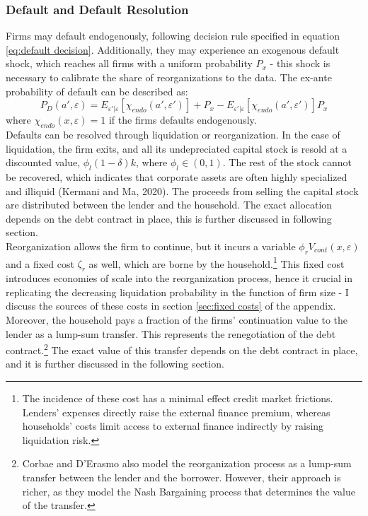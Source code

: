 \documentclass[12pt]{article}
\begin{document}
\subsubsection{Default and Default Resolution} \label{sec:default resolution}
Firms may default endogenously, following decision rule specified in equation \ref{eq:default decision}. Additionally, they may experience an exogenous default shock, which reaches all firms with a uniform probability $P_{x}$ - this shock is necessary to calibrate the share of reorganizations to the data. The ex-ante probability of default can be described as: 
\begin{equation} \label{eq:default probability}
    P_D(a', \varepsilon) = E_{\varepsilon'|\varepsilon}[\chi_{endo}(a',\varepsilon')] + P_{x} - E_{\varepsilon'|\varepsilon}[\chi_{endo}(a',\varepsilon')]P_{x}
\end{equation}
where $\chi_{endo}(x, \varepsilon) = 1$ if the firms defaults endogenously. \vspace{3mm} \\ 
Defaults can be resolved through liquidation or reorganization. In the case of liquidation, the firm exits, and all its undepreciated capital stock is resold at a discounted value, $\phi_l(1-\delta)k$, where $\phi_l \in (0,1)$. The rest of the stock cannot be recovered, which indicates that corporate assets are often highly specialized and illiquid (Kermani and Ma, 2020). The proceeds from selling the capital stock are distributed between the lender and the household. The exact allocation depends on the debt contract in place, this is further discussed in following section. \vspace{3mm} \\
Reorganization allows the firm to continue, but it incurs a variable $\phi_r V_{cont}(x,\varepsilon)$ and a fixed cost $\zeta_r$ as well, which are borne by the household.\footnote{The incidence of these cost has a minimal effect credit market frictions. Lenders' expenses directly raise the external finance premium, whereas households' costs limit access to external finance indirectly by raising liquidation risk.} This fixed cost introduces economies of scale into the reorganization process, hence it crucial in replicating the decreasing liquidation probability in the function of firm size - I discuss the sources of these costs in section \ref{sec:fixed costs} of the appendix. Moreover, the household pays a fraction of the firms' continuation value to the lender as a lump-sum transfer. This represents the renegotiation of the debt contract.\footnote{Corbae and D'Erasmo also model the reorganization process as a lump-sum transfer between the lender and the borrower. However, their approach is richer, as they model the Nash Bargaining process that determines the value of the transfer.} The exact value of this transfer depends on the debt contract in place, and it is further discussed in the following section. \vspace{3mm} \\
\end{document}
